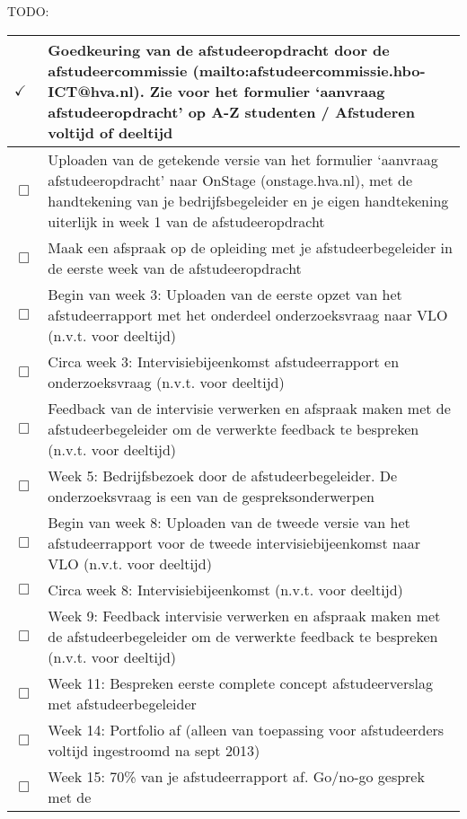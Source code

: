 TODO:
\begin{center}
    \begin{tabular}{ | l | p{15cm} |}
    \hline

    $\checkmark$ & Goedkeuring van de afstudeeropdracht door de
    afstudeercommissie (mailto:afstudeercommissie.hbo-ICT@hva.nl). Zie voor het
    formulier ‘aanvraag afstudeeropdracht’ op A-Z studenten / Afstuderen
    voltijd of deeltijd \\ \hline
    $\Box$ & Uploaden van de getekende versie van het formulier ‘aanvraag
    afstudeeropdracht’ naar OnStage (onstage.hva.nl), met de handtekening van
    je bedrijfsbegeleider en je eigen handtekening uiterlijk in week 1 van de
    afstudeeropdracht \\ \hline
    $\Box$ & Maak een afspraak op de opleiding met je afstudeerbegeleider in de
    eerste week van de afstudeeropdracht \\ \hline
    $\Box$ & Begin van week 3: Uploaden van de eerste opzet van het
    afstudeerrapport met het onderdeel onderzoeksvraag naar VLO (n.v.t. voor
    deeltijd) \\ \hline
    $\Box$ & Circa week 3: Intervisiebijeenkomst afstudeerrapport en
    onderzoeksvraag (n.v.t. voor deeltijd) \\ \hline
    $\Box$ & Feedback van de intervisie verwerken en afspraak maken met de
    afstudeerbegeleider om de verwerkte feedback te bespreken (n.v.t. voor
    deeltijd) \\ \hline
    $\Box$ & Week 5: Bedrijfsbezoek door de afstudeerbegeleider. De
    onderzoeksvraag is een van de gespreksonderwerpen \\ \hline
    $\Box$ & Begin van week 8: Uploaden van de tweede versie van het
    afstudeerrapport voor de tweede intervisiebijeenkomst naar VLO (n.v.t. voor
    deeltijd) \\ \hline
    $\Box$ & Circa week 8: Intervisiebijeenkomst (n.v.t. voor deeltijd) \\
    \hline
    $\Box$ & Week 9: Feedback intervisie verwerken en afspraak maken met de
    afstudeerbegeleider om de verwerkte feedback te bespreken (n.v.t. voor
    deeltijd) \\ \hline
    $\Box$ & Week 11:  Bespreken eerste complete concept afstudeerverslag met
    afstudeerbegeleider \\ \hline
    $\Box$ & Week 14:  Portfolio af (alleen van toepassing voor afstudeerders
    voltijd ingestroomd na sept 2013) \\ \hline
    $\Box$ & Week 15:  70\% van je afstudeerrapport af. Go/no-go gesprek met de

\end{tabular}
\end{center}
